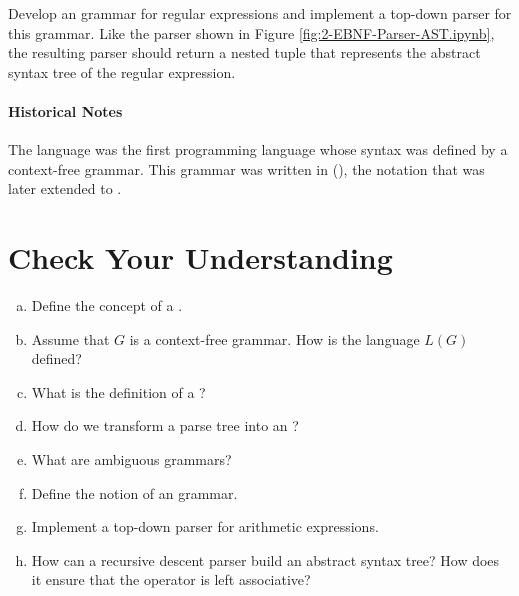 \exerciseEng
Develop an  grammar for regular
expressions and implement a top-down parser for this grammar.  Like the parser shown in Figure
\ref{fig:2-EBNF-Parser-AST.ipynb}, the resulting parser should return a nested tuple that represents the
abstract syntax tree of the regular expression.
\eox

\paragraph{Historical Notes} The language  \cite{backus:1959,naur:1960} was the first
programming language whose syntax was defined by a context-free grammar.  This grammar was written in
 (), the notation that was later extended to
.

\section{Check Your Understanding}
\begin{enumerate}[(a)]
\item Define the concept of a .
\item Assume that $G$ is a context-free grammar.  How is the language $L(G)$ defined?
\item What is the definition of a ?
\item How do we transform a parse tree into an ?
\item What are ambiguous grammars?  
\item Define the notion of an  grammar.
\item Implement a top-down parser for arithmetic expressions.
\item How can a recursive descent parser build an abstract syntax tree?  How does it ensure that the
      operator \squoted{-} is left associative?
\end{enumerate}

